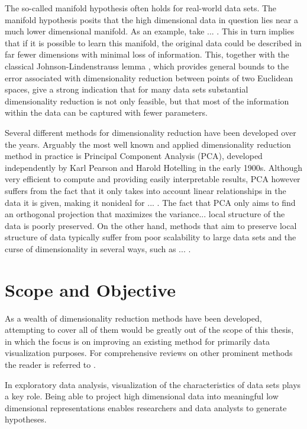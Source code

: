 The so-called manifold hypothesis \cite{manifold_hypothesis} often holds for real-world data sets. The manifold hypothesis posits that the high dimensional data in question lies near a much lower dimensional manifold. As an example, take ... . This in turn implies that if it is possible to learn this manifold, the original data could be described in far fewer dimensions with minimal loss of information. This, together with the classical Johnson-Lindenstrauss lemma \cite{johnson_lindenstrauss}, which provides general bounds to the error associated with dimensionality reduction between points of two Euclidean spaces, give a strong indication that for many data sets substantial dimensionality reduction is not only feasible, but that most of the information within the data can be captured with fewer parameters.

Several different methods for dimensionality reduction have been developed over the years. Arguably the most well known and applied dimensionality reduction method in practice is Principal Component Analysis (PCA), developed independently by Karl Pearson \cite{pca_1} and Harold Hotelling \cite{pca_2} in the early 1900s. Although very efficient to compute and providing easily interpretable results, PCA however suffers from the fact that it only takes into account linear relationships in the data it is given, making it nonideal for ... . The fact that PCA only aims to find an orthogonal projection that maximizes the variance... local structure of the data is poorly preserved. On the other hand, methods that aim to preserve local structure of data typically suffer from poor scalability to large data sets and the curse of dimensionality in several ways, such as ... .

\section{Scope and Objective}

As a wealth of dimensionality reduction methods have been developed, attempting to cover all of them would be greatly out of the scope of this thesis, in which the focus is on improving an existing method for primarily data visualization purposes. For comprehensive reviews on other prominent methods the reader is referred to \cite{first_dimensionality_reduction_review, second_dimensionality_reduction_review}.

In exploratory data analysis, visualization of the characteristics of data sets plays a key role. Being able to project high dimensional data into meaningful low dimensional representations enables researchers and data analysts to generate hypotheses.

